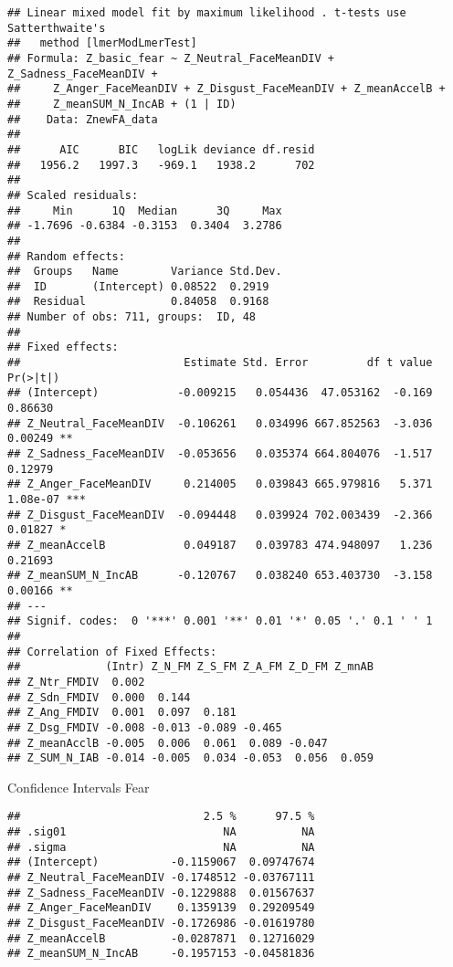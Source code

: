 \documentclass[
]{article}
\begin{document}
\begin{verbatim}
## Linear mixed model fit by maximum likelihood . t-tests use Satterthwaite's
##   method [lmerModLmerTest]
## Formula: Z_basic_fear ~ Z_Neutral_FaceMeanDIV + Z_Sadness_FaceMeanDIV +  
##     Z_Anger_FaceMeanDIV + Z_Disgust_FaceMeanDIV + Z_meanAccelB +  
##     Z_meanSUM_N_IncAB + (1 | ID)
##    Data: ZnewFA_data
## 
##      AIC      BIC   logLik deviance df.resid 
##   1956.2   1997.3   -969.1   1938.2      702 
## 
## Scaled residuals: 
##     Min      1Q  Median      3Q     Max 
## -1.7696 -0.6384 -0.3153  0.3404  3.2786 
## 
## Random effects:
##  Groups   Name        Variance Std.Dev.
##  ID       (Intercept) 0.08522  0.2919  
##  Residual             0.84058  0.9168  
## Number of obs: 711, groups:  ID, 48
## 
## Fixed effects:
##                         Estimate Std. Error         df t value Pr(>|t|)    
## (Intercept)            -0.009215   0.054436  47.053162  -0.169  0.86630    
## Z_Neutral_FaceMeanDIV  -0.106261   0.034996 667.852563  -3.036  0.00249 ** 
## Z_Sadness_FaceMeanDIV  -0.053656   0.035374 664.804076  -1.517  0.12979    
## Z_Anger_FaceMeanDIV     0.214005   0.039843 665.979816   5.371 1.08e-07 ***
## Z_Disgust_FaceMeanDIV  -0.094448   0.039924 702.003439  -2.366  0.01827 *  
## Z_meanAccelB            0.049187   0.039783 474.948097   1.236  0.21693    
## Z_meanSUM_N_IncAB      -0.120767   0.038240 653.403730  -3.158  0.00166 ** 
## ---
## Signif. codes:  0 '***' 0.001 '**' 0.01 '*' 0.05 '.' 0.1 ' ' 1
## 
## Correlation of Fixed Effects:
##             (Intr) Z_N_FM Z_S_FM Z_A_FM Z_D_FM Z_mnAB
## Z_Ntr_FMDIV  0.002                                   
## Z_Sdn_FMDIV  0.000  0.144                            
## Z_Ang_FMDIV  0.001  0.097  0.181                     
## Z_Dsg_FMDIV -0.008 -0.013 -0.089 -0.465              
## Z_meanAcclB -0.005  0.006  0.061  0.089 -0.047       
## Z_SUM_N_IAB -0.014 -0.005  0.034 -0.053  0.056  0.059
\end{verbatim}

Confidence Intervals Fear

\begin{verbatim}
##                            2.5 %      97.5 %
## .sig01                        NA          NA
## .sigma                        NA          NA
## (Intercept)           -0.1159067  0.09747674
## Z_Neutral_FaceMeanDIV -0.1748512 -0.03767111
## Z_Sadness_FaceMeanDIV -0.1229888  0.01567637
## Z_Anger_FaceMeanDIV    0.1359139  0.29209549
## Z_Disgust_FaceMeanDIV -0.1726986 -0.01619780
## Z_meanAccelB          -0.0287871  0.12716029
## Z_meanSUM_N_IncAB     -0.1957153 -0.04581836
\end{verbatim}
\end{document}
